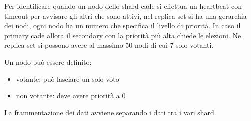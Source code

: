       Per identificare quando un nodo dello shard cade si effettua un heartbeat con timeout
      per avvisare gli altri che sono attivi, nel replica set si ha una gerarchia dei
      nodi, ogni nodo ha un numero che specifica il livello di priorità. In caso il
      primary cade allora il secondary con la priorità più alta chiede le elezioni.
      Ne replica set si possono avere al massimo 50 nodi di cui $7$ solo votanti.

Un nodo può essere definito:
\begin{itemize}
      \item votante: può lasciare un solo voto
      \item non votante: deve avere priorità a $0$
\end{itemize}

La frammentazione dei dati avviene separando i dati tra i vari shard.

